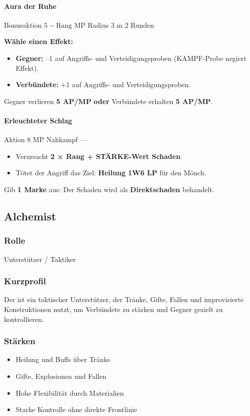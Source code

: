 \paragraph*{Aura der Ruhe}

\spellcard
{}
{Bonusaktion}
{$5 - \text{Rang}$ MP}
{Radius 3 m}
{2 Runden}
{
	\textbf{Wähle einen Effekt:}
	\begin{itemize}
		\item \textbf{Gegner:} --1 auf Angriffs- und Verteidigungsproben
		(KAMPF-Probe negiert Effekt).
		\item \textbf{Verbündete:} +1 auf Angriffs- und Verteidigungsproben.
	\end{itemize}
}
{
	Gegner verlieren \textbf{5 AP/MP}
	\textbf{oder}
	Verbündete erhalten \textbf{5 AP/MP}.
}

\paragraph*{Erleuchteter Schlag}

\spellcard
{}
{Aktion}
{8 MP}
{Nahkampf}
{—}
{
	\begin{itemize}
		\item Verursacht \textbf{2 × Rang + STÄRKE-Wert Schaden}.
		\item Tötet der Angriff das Ziel:
		\textbf{Heilung 1W6 LP} für den Mönch.
	\end{itemize}
}
{
	Gib \textbf{1 Marke} aus:
	Der Schaden wird als \textbf{Direktschaden} behandelt.
}

\subsection{Alchemist}

\subsubsection*{Rolle}
Unterstützer / Taktiker

\subsubsection*{Kurzprofil}
Der  ist ein taktischer Unterstützer,
der Tränke, Gifte, Fallen und improvisierte Konstruktionen nutzt,
um Verbündete zu stärken und Gegner gezielt zu kontrollieren.

\subsubsection*{Stärken}
\begin{itemize}
	\item Heilung und Buffs über Tränke
	\item Gifte, Explosionen und Fallen
	\item Hohe Flexibilität durch Materialien
	\item Starke Kontrolle ohne direkte Frontlinie
\end{itemize}

